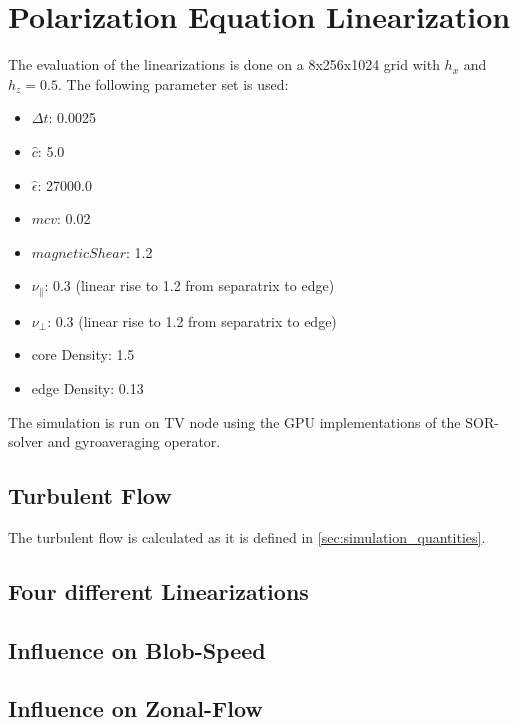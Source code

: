 \documentclass[master.tex]{subfiles}
\begin{document}
\chapter{Polarization Equation Linearization}\label{sec:polarization_equation_evaluation}
The evaluation of the linearizations is done on a 8x256x1024 grid with $h_x$ and $h_z=0.5$. The following parameter set is used:
\begin{itemize}
    \item $\Delta t$: 0.0025
    \item $\hat{c}$: 5.0
    \item $\hat{\epsilon}$: 27000.0
    \item $mcv$: 0.02
    \item $magnetic Shear$: 1.2
    \item $\nu_{\parallel}$: 0.3 (linear rise to 1.2 from separatrix to edge)
    \item $\nu_{\perp}$: 0.3 (linear rise to 1.2 from separatrix to edge)
    \item core Density: 1.5
    \item edge Density: 0.13
\end{itemize}
The simulation is run on \ac{TV} node using the GPU implementations of the \ac{SOR}-solver and gyroaveraging operator. 

\section{Turbulent Flow}
The turbulent flow is calculated as it is defined in \autoref{sec:simulation_quantities}.



\section{Four different Linearizations}
\section{Influence on Blob-Speed}
\section{Influence on Zonal-Flow}
\end{document}
